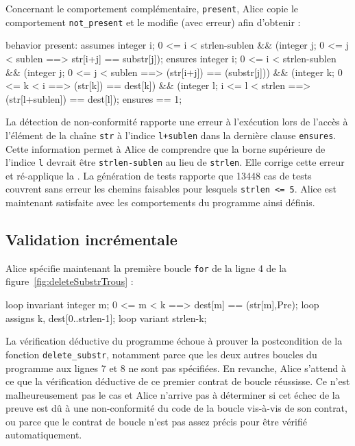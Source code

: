 Concernant le comportement complémentaire, \lstinline{present}, Alice copie le
comportement \lstinline{not_present} et le modifie (avec erreur) afin
d'obtenir :

\begin{pretty-codeACSL}
behavior present:
 assumes \exists integer i; 0 <= i < strlen-sublen && 
  (\forall integer j; 0 <= j < sublen ==> str[i+j] == substr[j]);
 ensures \exists integer i; 0 <= i < strlen-sublen &&
  (\forall integer j; 0 <= j < sublen ==> \old(str[i+j]) == \old(substr[j])) &&
  (\forall integer k; 0 <= k < i ==> \old(str[k]) == dest[k]) &&
  (\forall integer l; i <= l < strlen ==> \old(str[l+sublen]) == dest[l]);
 ensures \result == 1;
\end{pretty-codeACSL}

La détection de non-conformité rapporte une erreur à l'exécution lors de l'accès
à l'élément de la chaîne \lstinline{str} à l'indice \lstinline{l+sublen} dans
la dernière clause \lstinline{ensures}.
Cette information permet à Alice de comprendre que la borne supérieure de
l'indice \lstinline'l' devrait être \lstinline{strlen-sublen} au lieu de
\lstinline{strlen}.
Elle corrige cette erreur et ré-applique la \NCD.
La génération de tests rapporte que 13448 cas de tests couvrent sans erreur les
chemins faisables pour lesquels \lstinline{strlen <= 5}.
Alice est maintenant satisfaite avec les comportements du programme ainsi
définis.


\subsection{Validation incrémentale}
\label{sec:ncd-incr}


Alice spécifie maintenant la première boucle \lstinline'for' de la ligne 4 de la
figure~\ref{fig:deleteSubstrTrous} :

\begin{pretty-codeACSL}
loop invariant \forall integer m; 0 <= m < k ==> dest[m] == \at(str[m],Pre);
loop assigns k, dest[0..strlen-1];
loop variant strlen-k;
\end{pretty-codeACSL}

La vérification déductive du programme échoue à prouver la postcondition de la
fonction \lstinline{delete_substr}, notamment parce que les deux autres boucles
du programme aux lignes 7 et 8 ne sont pas spécifiées.
En revanche, Alice s'attend à ce que la vérification déductive de ce premier
contrat de boucle réussisse.
Ce n'est malheureusement pas le cas et Alice n'arrive pas à déterminer si cet
échec de la preuve est dû à une non-conformité du code de la boucle vis-à-vis de
son contrat, ou parce que le contrat de boucle n'est pas assez précis pour être
vérifié automatiquement.

